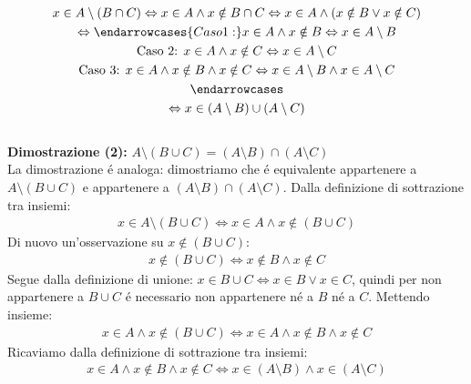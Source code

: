 \documentclass[twoside]{article} %
\begin{document}
\def\beginarrowcases#1\endarrowcases{
}
\begin{gather*}
  x\in A\setminus(B\cap C)\Leftrightarrow x\in A \wedge x\notin B\cap C \Leftrightarrow x\in A\wedge (x\notin B\vee x\notin C)\\
  \Leftrightarrow
  \beginarrowcases
    \text{Caso 1: } x\in A \wedge x\notin B\Leftrightarrow x\in A\setminus B \\
    \text{Caso 2: } x\in A \wedge x\notin C\Leftrightarrow x\in A\setminus C\\
    \text{Caso 3: } x\in A \wedge x\notin B\wedge x\notin C\Leftrightarrow x\in A\setminus B\wedge x\in A\setminus C\\
  \endarrowcases\\
  \Leftrightarrow x\in (A\setminus B)\cup (A\setminus C)
\end{gather*}
\\
	\textbf{Dimostrazione (2): }$A\setminus(B\cup C)=(A\setminus B)\cap (A\setminus C)$\\
	La dimostrazione \'e analoga: dimostriamo che \'e equivalente appartenere a $A\setminus(B\cup C)$ e appartenere a $(A\setminus B)\cap (A\setminus C)$. Dalla definizione di sottrazione tra insiemi:
	\begin{gather*}
		x\in A\setminus(B\cup C) \Leftrightarrow x\in A \wedge x\notin (B\cup C)
	\end{gather*}
	Di nuovo un'osservazione su $x\notin (B\cup C)$:
	\begin{gather*}
		x\notin (B\cup C)\Leftrightarrow x\notin B \wedge x\notin C
	\end{gather*}
	Segue dalla definizione di unione: $x\in B\cup C\Leftrightarrow x\in B \vee x\in C$, quindi per non appartenere a $B\cup C$ \'e necessario non appartenere n\'e a $B$ n\'e a $C$. Mettendo insieme:
	\begin{gather*}
		x\in A \wedge x\notin (B\cup C)\Leftrightarrow x\in A \wedge x\notin B\wedge x\notin C
	\end{gather*}	
	Ricaviamo dalla definizione di sottrazione tra insiemi:
	\begin{gather*}
		x\in A \wedge x\notin B\wedge x\notin C\Leftrightarrow x\in (A\setminus B) \wedge x\in (A\setminus C)
	\end{gather*}
\end{document}
